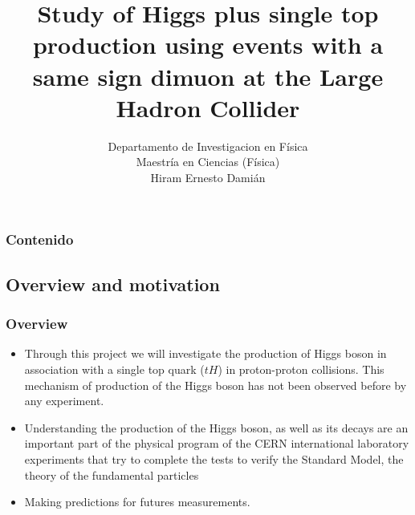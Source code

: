 \documentclass[11pt]{beamer}
\begin{document}
	\author{
		Departamento de Investigacion en F\'isica \\
		Maestr\'ia en Ciencias (F\'isica)\\
		Hiram Ernesto Dami\'an}
	\title{Study of Higgs plus single top production using events with a same sign dimuon  at the Large Hadron Collider}
	\newcommand{\nologo}{\setbeamertemplate{logo}{}}
	\newcommand{\subf}[2]{%
		{\small\begin{tabular}[t]{@{}c@{}}
				#1\\#2
		\end{tabular}}%
	}
	\begin{frame}
	\titlepage
\end{frame}

\begin{frame}
\tableofcontents
\frametitle{Contenido}
\end{frame}


\begin{frame}
\section{Overview and motivation}
\frametitle{Overview}
\begin{itemize}
\item Through this project we will investigate the production of Higgs boson in association with a
single top quark ($tH$) in proton-proton collisions. 
This mechanism of production of the Higgs boson has not been observed before by any
experiment.

\item Understanding the production of the Higgs boson, as well as its decays are an important part
of the physical program of the CERN international laboratory experiments that try to complete
the tests to verify the Standard Model, the theory of the fundamental particles
\item Making predictions for futures measurements.
\end{itemize}
\end{frame}
\end{document}
